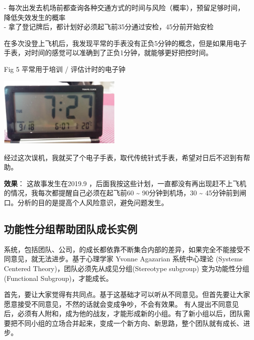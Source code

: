 -
每次出发去机场前都查询各种交通方式的时间与风险（概率），预留足够时间，降低失效发生的概率\\
- 拿了登记牌后，都计划好必须起飞前35分通过安检，45分前开始安检

在多次没登上飞机后，我发现平常的手表没有正负5分钟的概念，但是如果用电子手表，对时间的感觉可以准确到了正负1分钟，就能够更好把控时间。

Fig 5 平常用于培训 / 评估计时的电子钟


\includegraphics[width=6cm]{风险与机会5_闹钟.png}

经过这次误机，我就买了个电子手表，取代传统针式手表，希望对日后不迟到有帮助。

\textbf{效果}： 这故事发生在2019.9
，后面我按这些计划，一直都没有再出现赶不上飞机的情况，我每次都提醒自己必须在起飞前60
\textasciitilde{} 90分钟到机场，30 \textasciitilde{}
45分钟前到闸口。分析的目的是提高个人风险意识，避免问题发生。

\hypertarget{ux529fux80fdux6027ux5206ux7ec4ux5e2eux52a9ux56e2ux961fux6210ux957fux5b9eux4f8b}{%
\subsection{功能性分组帮助团队成长实例}\label{ux529fux80fdux6027ux5206ux7ec4ux5e2eux52a9ux56e2ux961fux6210ux957fux5b9eux4f8b}}

系统，包括团队、公司，的成长都依靠不断集合内部的差异，如果完全不能接受不同意见，就无法进步。基于心理学家
Yvonne Agazarian 系统中心理论 (Systems Centered
Theory)，团队必须先从成见分组(Stereotype subgroup)
变为功能性分组(Functional Subgroup)，才能成长。

首先，要让大家觉得有共同点。基于这基础才可以听从不同意见。但首先要让大家愿意接受不同意见，不然的话就会变成争吵，不会有效果。
有人提出不同意见后，必须有人附和，成为他的战友，才能形成新的小组。有了新小组以后，团队需要把不同小组的立场合并起来，变成一个新方向、新思路，整个团队就有成长、进步。

